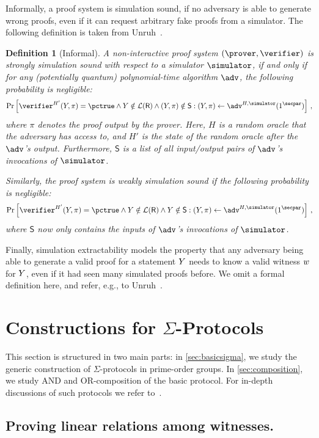 \documentclass[runningheads,11pt]{article}
\newtheorem{definition}{Definition}
\begin{document}
Informally, a proof system is simulation sound, if no adversary is able to generate wrong proofs, even if it can request arbitrary fake proofs from a simulator.
The following definition is taken from Unruh~\cite{AC:Unruh17}.
\begin{definition}[Informal]
  A non-interactive proof system $(\prover,\verifier)$ is \emph{strongly simulation sound} with respect to a simulator $\simulator$, if and only if for any (potentially quantum) polynomial-time algorithm $\adv$, the following probability is negligible:
  $$
    \Pr\left[\verifier^{H'}(\statement,\pi)=\accept\land\statement\notin\lang(\relation)\land(\statement,\pi)\notin\mathsf{S} : (\statement,\pi)\gets\adv^{H,\simulator}(1^\secpar) \right]\,,
  $$
  where $\pi$ denotes the proof output by the prover.
  Here, $H$ is a random oracle that the adversary has access to, and $H'$ is the state of the random oracle after the $\adv$'s output.
  Furthermore, $\mathsf{S}$ is a list of all input/output pairs of $\adv$'s invocations of $\simulator$.

  Similarly, the proof system is \emph{weakly simulation sound} if the following probability is negligible:
  $$
    \Pr\left[\verifier^{H'}(\statement,\pi)=\accept\land\statement\notin\lang(\relation)\land\statement\notin\mathsf{S} : (\statement,\pi)\gets\adv^{H,\simulator}(1^\secpar) \right]\,,
  $$
  where $\mathsf{S}$ now only contains the inputs of $\adv$'s invocations of $\simulator$.
\end{definition}

Finally, simulation extractability models the property that any adversary being able to generate a valid proof for a statement $Y$ needs to know a valid witness $w$ for $Y$, even if it had seen many simulated proofs before.
We omit a formal definition here, and refer, e.g., to Unruh~\cite{AC:Unruh17}.


\section{Constructions for $\Sigma$-Protocols}

This section is structured in two main parts: in \cref{sec:basicsigma}, we study the generic construction of $\Sigma$-protocols in prime-order groups. In \cref{sec:composition}, we study AND and OR-composition of the basic protocol.
For in-depth discussions of such protocols we refer to~\cite{bangerter05,AFRICACRYPT:Maurer09,DBLP:journals/dcc/Maurer15}.

\subsection{Proving linear relations among witnesses.}
\end{document}
